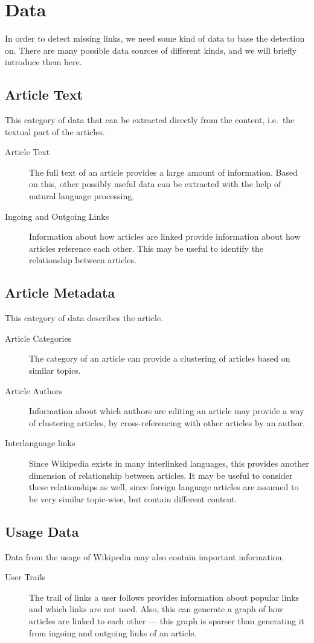 \section{Data}\label{sec:data}
In order to detect missing links, we need some kind of data to base the detection on. There are many possible data sources of different kinds, and we will briefly introduce them here.


\subsection{Article Text}
This category of data that can be extracted directly from the content, i.e.\ the textual part of the articles.
\begin{description}
  \item[Article Text] The full text of an article provides a large amount of information. Based on this, other possibly useful data can be extracted with the help of natural language processing.
  \item[Ingoing and Outgoing Links] Information about how articles are linked provide information about how articles reference each other. This may be useful to identify the relationship between articles.
\end{description}

\subsection{Article Metadata}
This category of data describes the article.
\begin{description}
  \item[Article Categories] The category of an article can provide a clustering of articles based on similar topics.
  \item[Article Authors] Information about which authors are editing an article may provide a way of clustering articles, by cross-referencing with other articles by an author.
  \item[Interlanguage links] Since Wikipedia exists in many interlinked languages, this provides another dimension of relationship between articles. It may be useful to consider these relationships as well, since foreign language articles are assumed to be very similar topic-wise, but contain different content.
\end{description}

\subsection{Usage Data}
Data from the usage of Wikipedia may also contain important information.
\begin{description}
  \item[User Trails] The trail of links a user follows provides information about popular links and which links are not used. Also, this can generate a graph of how articles are linked to each other --- this graph is sparser than generating it from ingoing and outgoing links of an article.
\end{description}

